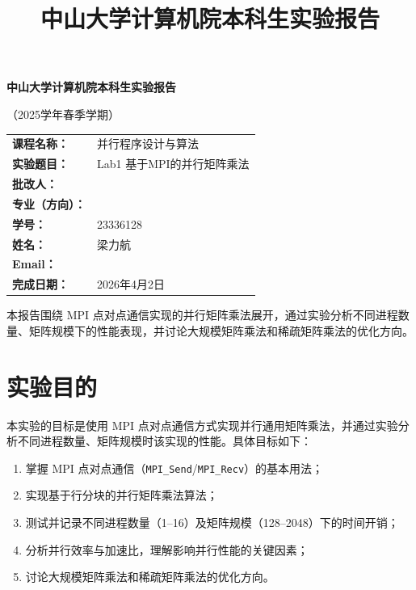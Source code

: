 \documentclass[UTF8,a4paper,12pt]{ctexart}
\title{\heiti 中山大学计算机院本科生实验报告}
\author{}
\date{}
\begin{document}
\begin{titlepage}
  \centering
  {\bfseries 中山大学计算机院本科生实验报告\par}
  \vspace{0.5em}
  {（2025学年春季学期）\par}
  \vspace{2em}

  \begin{tabularx}{0.9\textwidth}{>{\bfseries}p{4cm}X}
    课程名称： & 并行程序设计与算法 \\
    实验题目： & Lab1 基于MPI的并行矩阵乘法 \\
    批改人： & \\
    专业（方向）： & \\
    学号： & 23336128 \\
    姓名： & 梁力航 \\
    Email： & \\
    完成日期： & 2026年4月2日 \\
  \end{tabularx}

  \vfill
  \begin{minipage}{0.88\textwidth}
    \small
    本报告围绕 MPI 点对点通信实现的并行矩阵乘法展开，通过实验分析不同进程数量、矩阵规模下的性能表现，并讨论大规模矩阵乘法和稀疏矩阵乘法的优化方向。
  \end{minipage}
\end{titlepage}

\section{实验目的}

本实验的目标是使用 MPI 点对点通信方式实现并行通用矩阵乘法，并通过实验分析不同进程数量、矩阵规模时该实现的性能。具体目标如下：

\begin{enumerate}[leftmargin=2.2em]
  \item 掌握 MPI 点对点通信（\texttt{MPI\_Send}/\texttt{MPI\_Recv}）的基本用法；
  \item 实现基于行分块的并行矩阵乘法算法；
  \item 测试并记录不同进程数量（1--16）及矩阵规模（128--2048）下的时间开销；
  \item 分析并行效率与加速比，理解影响并行性能的关键因素；
  \item 讨论大规模矩阵乘法和稀疏矩阵乘法的优化方向。
\end{enumerate}
\end{document}
